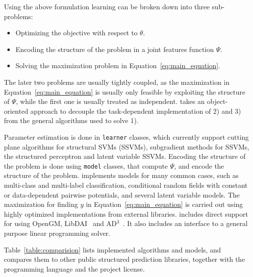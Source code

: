 Using the above formulation learning can be broken down into three sub-problems:
\begin{itemize}
    \item Optimizing the objective with respect to $\theta$.
    \item Encoding the structure of the problem in a joint features function $\Psi$.
    \item Solving the maximization problem in Equation~\ref{eq:main_equation}.
\end{itemize}

The later two problems are usually tightly coupled, as the maximization in
Equation~\ref{eq:main_equation} is usually only feasible by exploiting the
structure of $\Psi$, while the first one is usually treated as independent.
\pystruct takes an object-oriented approach to decouple the task-dependent
implementation of 2) and 3) from the general algorithms used to solve 1).

Parameter estimation is done in \texttt{learner} classes, which currently support
cutting plane algorithms for structural SVMs (SSVMs), subgradient methods for SSVMs,
the structured perceptron and latent variable SSVMs.
Encoding the structure of the problem is done using \texttt{model} classes, that
compute $\Psi$, and encode the structure of the problem.
\pystruct implements models for many common cases, such as multi-class and
multi-label classification, conditional random fields with constant or
data-dependent pairwise potentials, and several latent variable models.
The maximization for finding $y$ in Equation~\ref{eq:main_equation} is carried out
using highly optimized implementations from external libraries. \pystruct
includes direct support for using {\sc OpenGM}, {\sc LibDAI}~\citep{Mooij_libDAI_10} and {\sc
AD$^3$}~\citep{martins2011augmented}. It also includes an interface to a
general purpose linear programming solver.

Table~\ref{table:comparision} lists implemented algorithms and models, and
compares them to other public structured prediction libraries, together with
the programming language and the project license.


